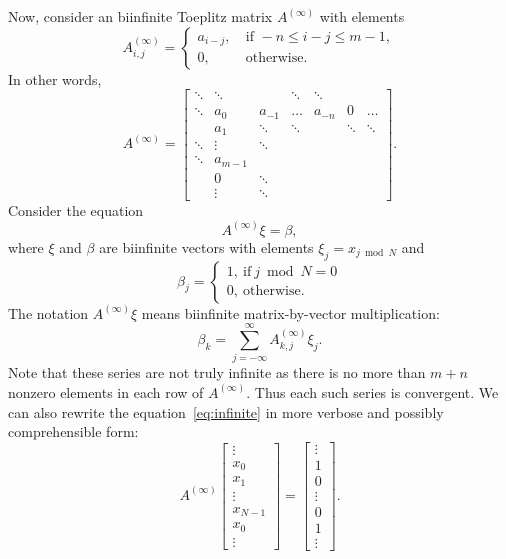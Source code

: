\documentclass{article}
\begin{document}
	Now, consider an biinfinite Toeplitz matrix $A^{(\infty)}$ with elements
	\[
	A^{(\infty)}_{i,j}
	=
	\begin{cases}
	    a_{i-j},~&\text{if } -n \le i-j \le m-1,\\
	    0,~&\text{otherwise}.
	\end{cases}
	\]
	In other words,
	\[
	A^{(\infty)} = \begin{bmatrix}
	\ddots & \ddots &        & \ddots  & \ddots  &        &        \\
	\ddots & a_0    & a_{-1} & \dots   &  a_{-n} &    0   & \dots  \\
	       & a_1    & \ddots & \ddots  &         & \ddots & \ddots \\
	\ddots & \vdots & \ddots &         &         &        &        \\
	\ddots & a_{m-1}&        &         &         &        &        \\
	       & 0      & \ddots &         &         &        &        \\
	       & \vdots & \ddots &         &         &        &        
	\end{bmatrix}.
	\]
	Consider the equation
	\begin{equation}\label{eq:infinite}
	A^{(\infty)} \xi = \beta,
	\end{equation}
	where $\xi$ and $\beta$ are biinfinite vectors with elements
	$\xi_{j} = x_{j \bmod N}$ and 
	\[
	\beta_{j} = \begin{cases}
	    1,~\text{if}~j \bmod N = 0 \\
	    0,~\text{otherwise}.
	\end{cases}
	\]
	The notation $A^{(\infty)}\xi$ means biinfinite matrix-by-vector multiplication:
	\[
	\beta_{k} = \sum_{j=-\infty}^{\infty}A^{(\infty)}_{k,j}\xi_{j}.
	\]
	Note that these series are not truly infinite as there is no more than $m+n$ nonzero elements in each row of $A^{(\infty)}$.
	Thus each such series is convergent.
	We can also rewrite the equation~\eqref{eq:infinite} in more verbose and possibly comprehensible form:
	\[
	A^{(\infty)}
	\begin{bmatrix}
	\vdots \\
	x_0 \\
	x_1 \\
	\vdots \\
	x_{N-1} \\
	x_0 \\
	\vdots
	\end{bmatrix}
	=
	\begin{bmatrix}
	\vdots \\
	1 \\
	0 \\
	\vdots \\
	0 \\
	1 \\
	\vdots
	\end{bmatrix}.
	\]
	
\end{document}
